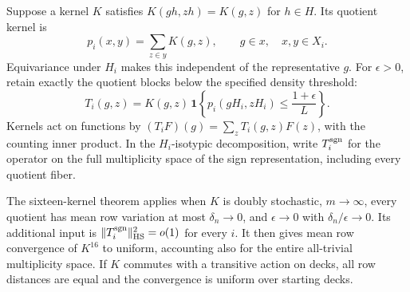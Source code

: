 Suppose a kernel $K$ satisfies $K(gh,zh)=K(g,z)$ for $h\in H$.
Its quotient kernel is
\[
 p_i(x,y)=\sum_{z\in y}K(g,z),\qquad g\in x,\quad x,y\in X_i.
\]
Equivariance under $H_i$ makes this independent of the representative
$g$. For $\epsilon>0$, retain exactly the quotient blocks below the
specified density threshold:
\begin{equation}
 T_i(g,z)=K(g,z)\,
 \mathbf1\left\{p_i(gH_i,zH_i)\le\frac{1+\epsilon}{L}\right\}.
 \label{lifts:kernel-cutoff}
\end{equation}
Kernels act on functions by $(T_iF)(g)=\sum_zT_i(g,z)F(z)$, with
the counting inner product. In the $H_i$-isotypic decomposition,
write $T_i^{\operatorname{sgn}}$ for the operator on the full multiplicity space
of the sign representation, including every quotient fiber.

The sixteen-kernel theorem
\cite[Theorem~]{partial-fourier} applies
when $K$ is doubly stochastic, $m\to\infty$, every quotient has mean
row variation at most $\delta_n\to0$, and
$\epsilon\to0$ with $\delta_n/\epsilon\to0$. Its additional input is
$\|T_i^{\operatorname{sgn}}\|_{\mathrm{HS}}^2=o(1)$ for every $i$. It then gives mean row
convergence of $K^{16}$ to uniform, accounting also for the entire
all-trivial multiplicity space. If $K$ commutes with a transitive
action on decks, all row distances are equal and the convergence is
uniform over starting decks.

